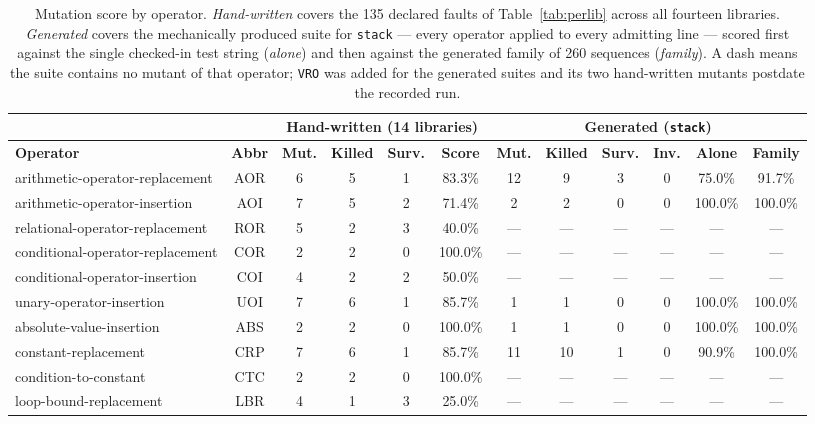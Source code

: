 \documentclass[conference]{IEEEtran}
\begin{document}
\begin{table}[t]
\centering
\caption{Mutation score by operator. \textit{Hand-written} covers the 135 declared
faults of Table~\ref{tab:perlib} across all fourteen libraries. \textit{Generated}
covers the mechanically produced suite for \texttt{stack} --- every operator applied to
every admitting line --- scored first against the single checked-in test string
(\textit{alone}) and then against the generated family of 260 sequences
(\textit{family}). A dash means the suite contains no mutant of that operator;
\texttt{VRO} was added for the generated suites and its two hand-written mutants
postdate the recorded run.}
\label{tab:ops}
\setlength{\tabcolsep}{3pt}
\scriptsize
\begin{tabular}{|l|c|c|c|c|c|c|c|c|c|c|c|}
\hline
 & & \multicolumn{4}{c|}{\textbf{Hand-written (14 libraries)}} & \multicolumn{6}{c|}{\textbf{Generated (\texttt{stack})}} \\
\hline
\textbf{Operator} & \textbf{Abbr} & \textbf{Mut.} & \textbf{Killed} & \textbf{Surv.} & \textbf{Score} & \textbf{Mut.} & \textbf{Killed} & \textbf{Surv.} & \textbf{Inv.} & \textbf{Alone} & \textbf{Family} \\
\hline
arithmetic-operator-replacement & AOR & 6 & 5 & 1 & 83.3\% & 12 & 9 & 3 & 0 & 75.0\% & 91.7\% \\
\hline
arithmetic-operator-insertion & AOI & 7 & 5 & 2 & 71.4\% & 2 & 2 & 0 & 0 & 100.0\% & 100.0\% \\
\hline
relational-operator-replacement & ROR & 5 & 2 & 3 & 40.0\% & --- & --- & --- & --- & --- & --- \\
\hline
conditional-operator-replacement & COR & 2 & 2 & 0 & 100.0\% & --- & --- & --- & --- & --- & --- \\
\hline
conditional-operator-insertion & COI & 4 & 2 & 2 & 50.0\% & --- & --- & --- & --- & --- & --- \\
\hline
unary-operator-insertion & UOI & 7 & 6 & 1 & 85.7\% & 1 & 1 & 0 & 0 & 100.0\% & 100.0\% \\
\hline
absolute-value-insertion & ABS & 2 & 2 & 0 & 100.0\% & 1 & 1 & 0 & 0 & 100.0\% & 100.0\% \\
\hline
constant-replacement & CRP & 7 & 6 & 1 & 85.7\% & 11 & 10 & 1 & 0 & 90.9\% & 100.0\% \\
\hline
condition-to-constant & CTC & 2 & 2 & 0 & 100.0\% & --- & --- & --- & --- & --- & --- \\
\hline
loop-bound-replacement & LBR & 4 & 1 & 3 & 25.0\% & --- & --- & --- & --- & --- & --- \\

\end{tabular}
\end{table}
\end{document}
